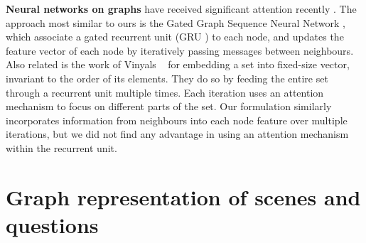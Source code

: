 \textbf{Neural networks on graphs} have received significant attention recently \cite{duvenaud2015molecular,jain2016graphs,li2015graph}. The approach most similar to ours is the Gated Graph Sequence Neural Network \cite{li2015graph}, which associate a gated recurrent unit (GRU \cite{cho2014learning}) to each node, and updates the feature vector of each node by iteratively passing messages between neighbours. Also related is the work of Vinyals \etal~\cite{vinyals2015sets} for embedding a set into fixed-size vector, invariant to the order of its elements. They do so by feeding the entire set through a recurrent unit multiple times. Each iteration uses an attention mechanism to focus on different parts of the set. Our formulation similarly incorporates information from neighbours into each node feature over multiple iterations, but we did not find any advantage in using an attention mechanism within the recurrent unit.


\section{Graph representation of scenes and questions}
\vspace{-4pt}

